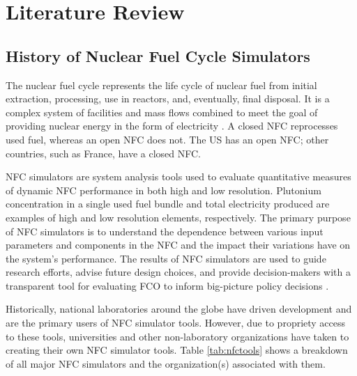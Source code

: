 \chapter{Literature Review}

\section{History of Nuclear Fuel Cycle Simulators}
The nuclear fuel cycle represents the life cycle of nuclear fuel from initial
extraction, processing, use in reactors, and, eventually, 
final disposal.
It is a complex system of facilities and mass flows 
combined to meet the goal of providing nuclear energy 
in the form of electricity \cite{yacout_modeling_2005}.
A closed \gls{NFC} reprocesses used fuel, whereas an open 
\gls{NFC} does not.  
The US has an open \gls{NFC}; other countries, such as France, 
have a closed NFC. 

\gls{NFC} simulators are system analysis tools used to evaluate 
quantitative measures of dynamic \gls{NFC} performance 
in both high and low resolution. 
Plutonium concentration in a single used fuel bundle and 
total electricity produced are examples of high and low 
resolution elements, respectively.   
The primary purpose of \gls{NFC} simulators is to understand the 
dependence between various input parameters and components 
in the \gls{NFC} and the impact their variations have on 
the system's performance. 
The results of \gls{NFC} simulators are used to guide research 
efforts, advise future design choices, and provide 
decision-makers with a transparent tool for evaluating \gls{FCO} 
to inform big-picture policy decisions \cite{yacout_modeling_2005}.

Historically, national laboratories around the globe have driven 
development and are the primary users of \gls{NFC} simulator tools. 
However, due to propriety access to these tools, universities and 
other non-laboratory organizations have taken to creating their 
own \gls{NFC} simulator tools. 
Table \ref{tab:nfctools} shows a breakdown of all major \gls{NFC} simulators
and the organization(s) associated with them.  

